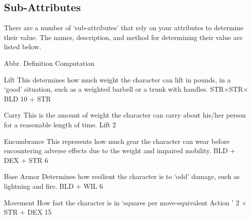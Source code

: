 \documentclass[twoside]{book}
\begin{document}
\subsection{Sub-Attributes}
     There are a number of `sub-attributes'
               that rely on your attributes to determine their value. The
               names, description, and method for determining their value
               are listed below.   
                
                  
                   Abbr.   
                   Definition   
                   Computation   
                  
                  
                   Lift   
                     This determines how much weight the character
                     can lift in pounds, in a `good'
                     situation, such as a weighted barbell or a trunk
                     with handles. 
                           STR\ensuremath{\times}STR\ensuremath{\times}BLD
                        10      +   
                     STR   
                    
                  
                  
                   Carry   
                     This is the amount of weight the character can
                     carry about his/her person for a reasonable length
                     of time. 
                           Lift    2  
                       
                    
                  
                  
                   Encumbrance   
                     This represents how much gear the character
                     can wear before encountering adverse effects due to
                     the weight and impaired mobility. 
                             BLD  +
                      DEX  +  STR  
                        6     
                    
                  
                  
                   Base Armor   
                     Determines how resilient the character is to
                     `odd' damage, such as lightning and
                     fire. 
                           BLD  +
                      WIL    6    
                     
                    
                  
                  
                   Movement   
                     How fast the character is in `squares
                     per move-equivalent Action ' 
                           2  \ensuremath{\times}
                      STR  +  DEX 
                       15     
                    
\end{document}
